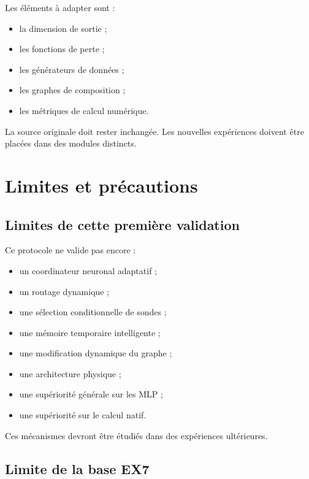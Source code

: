 \documentclass[11pt,a4paper]{article}
\begin{document}
Les éléments à adapter sont :
\begin{itemize}
    \item la dimension de sortie ;
    \item les fonctions de perte ;
    \item les générateurs de données ;
    \item les graphes de composition ;
    \item les métriques de calcul numérique.
\end{itemize}

La source originale doit rester inchangée.
Les nouvelles expériences doivent être placées
dans des modules distincts.

\section{Limites et précautions}

\subsection{Limites de cette première validation}

Ce protocole ne valide pas encore :

\begin{itemize}
    \item un coordinateur neuronal adaptatif ;
    \item un routage dynamique ;
    \item une sélection conditionnelle de sondes ;
    \item une mémoire temporaire intelligente ;
    \item une modification dynamique du graphe ;
    \item une architecture physique ;
    \item une supériorité générale sur les MLP ;
    \item une supériorité sur le calcul natif.
\end{itemize}

Ces mécanismes devront être étudiés dans des expériences
ultérieures.

\subsection{Limite de la base EX7}
\end{document}
